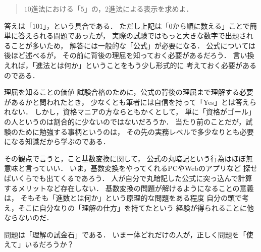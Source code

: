 \documentclass[a5j, uplatex, dvipdfmx]{jsbook}
\begin{document}
    \begin{quote}
        $10$進法における「$5$」の，$2$進法による表示を求めよ．
    \end{quote}
    
    答えは「$101$」，という具合である．
    ただし上記は「$0$から順に数える」ことで簡単に答えられる問題であったが，
    実際の試験ではもっと大きな数字で出題されることが多いため，
    解答には一般的な「公式」が必要になる．
    公式については後ほど述べるが，
    その前に背後の理屈を知っておく必要があるだろう．
    言い換えれば，「進法とは何か」ということをもう少し形式的に
    考えておく必要があるのである．

    \begin{rem}{理屈を知ることの価値}{}
        試験合格のために，公式の背後の理屈まで理解する必要があるかと問われたとき，
        少なくとも筆者には自信を持って「Yes」とは答えられない．
        しかし，資格マニアの方ならともかくとして，
        単に「資格がゴール」の人というのは割合的に少ないのではないだろうか．
        当たり前のことだが，試験のために勉強する事柄というのは，
        その先の実務レベルで多少なりとも必要になる知識だから学ぶのである．

        その観点で言うと，こと基数変換に関して，
        公式の丸暗記という行為はほぼ無意味と言っていい．
        いま，基数変換をやってくれるPCやWebのアプリなど
        探せばいくらでも出てくるであろう．
        人が自分で丸暗記した公式に突っ込んで計算するメリットなど存在しない．
        基数変換の問題が解けるようになることの意義は，
        そもそも「進数とは何か」という原理的な問題をある程度
        自分の頭で考え，そこに自分なりの「理解の仕方」を持てたという
        経験が得られることに他ならないのだ．

        問題は「理解の試金石」である．
        いま一体どれだけの人が，正しく問題を「使えて」いるだろうか？
    \end{rem}
\end{document}
